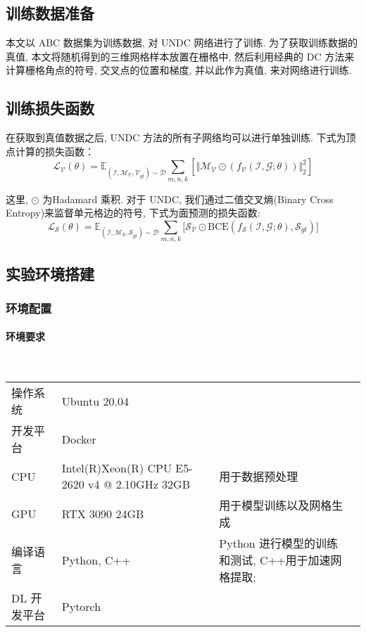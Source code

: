 \subsection{训练数据准备}
本文以 ABC 数据集为训练数据, 对 UNDC 网络进行了训练. 为了获取训练数据的真值, 本文将随机得到的三维网格样本放置在栅格中, 然后利用经典的 DC 方法来计算栅格角点的符号, 交叉点的位置和梯度, 并以此作为真值, 来对网络进行训练. 
\subsection{训练损失函数}
在获取到真值数据之后, UNDC 方法的所有子网络均可以进行单独训练. 下式为顶点计算的损失函数：
\begin{equation}
\mathcal{L_V}(\theta)=\mathbb{E}_{(\mathcal{I, M_V, V}_{gt})\sim \mathcal{D}}\sum _{m,n,k} [ \Vert \mathcal{M_V} \odot (f_{\mathcal{V}}(\mathcal{I,G};\theta)) \Vert ^2_2 ]
\end{equation}

这里, $\odot$ 为Hadamard 乘积. 对于 UNDC, 我们通过二值交叉熵(Binary Cross Entropy)来监督单元格边的符号, 下式为面预测的损失函数:
\begin{equation}
\mathcal{L_S}(\theta)=\mathbb{E}_{(\mathcal{I, M_S, S}_{gt})\sim \mathcal{D}}\sum_{m,n,k} \lbrack \mathcal{S_V} \odot \mathrm{BCE}(f_\mathcal{S}(\mathcal{I,G};\theta), \mathcal{S}_{gt}) \rbrack
\end{equation}

\subsection{实验环境搭建}
\subsubsection{环境配置}
\paragraph{环境要求}~{}

\begin{table}[h]
    \centering
    \begin{tabularx}{\textwidth}{X X X X}
		操作系统 & Ubuntu 20.04 & \\
		开发平台 & Docker & \\
		CPU & Intel(R)Xeon(R) CPU E5-2620 v4 @ 2.10GHz 32GB & 用于数据预处理 \\
		GPU & RTX 3090 24GB & 用于模型训练以及网格生成 \\
		编译语言 & Python, C++ & Python 进行模型的训练和测试, C++用于加速网格提取; \\
		DL 开发平台 & Pytorch & \\
    \end{tabularx}
\end{table}


